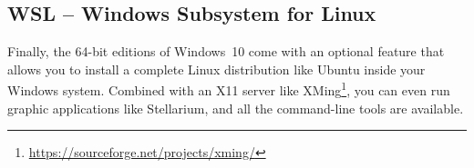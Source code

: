 \subsection{WSL -- Windows Subsystem for Linux}
\label{sec:landscapes:WSL}

Finally, the 64-bit editions of Windows~10 come with an optional
feature that allows you to install a complete Linux distribution like
Ubuntu inside your Windows system. Combined with an X11 server like
XMing\footnote{\url{https://sourceforge.net/projects/xming/}}, you can
even run graphic applications like Stellarium, and all the
command-line tools are available.



